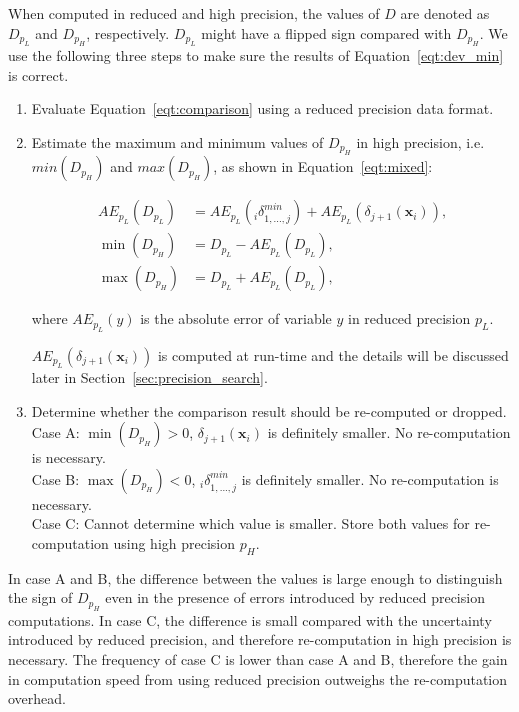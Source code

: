 When computed in reduced and high precision, the values of $D$ are denoted as $D_{p_L}$ and $D_{p_H}$, respectively.
$D_{p_L}$ might have a flipped sign compared with $D_{p_H}$.
We use the following three steps to make sure the results of Equation~\ref{eqt:dev_min} is correct.

\begin{enumerate}
\item Evaluate Equation~\ref{eqt:comparison} using a reduced precision data format. 
\item Estimate the maximum and minimum values of $D_{p_H}$ in high precision, i.e. $min(D_{p_H})$ and $max(D_{p_H})$, as shown in Equation~\ref{eqt:mixed}:

\begin{equation}
\begin{aligned}
AE_{p_L}(D_{p_L}) &= AE_{p_L}({_i\delta}^{min}_{1,...,j}) + AE_{p_L}(\delta_{j+1}(\textbf{x}_i)) \mbox{,} \\
\min{(D_{p_H})} &= D_{p_L} - AE_{p_L}(D_{p_L}) \mbox{,} \\
\max{(D_{p_H})} &= D_{p_L} + AE_{p_L}(D_{p_L}) \mbox{,}
\end{aligned}
\label{eqt:mixed}
\end{equation}

where $AE_{p_L}(y)$ is the absolute error of variable $y$ in reduced precision $p_L$.

$AE_{p_L}(\delta_{j+1}(\textbf{x}_i))$ is computed at run-time and the details will be discussed later in Section~\ref{sec:precision_search}.

\item Determine whether the comparison result should be re-computed or dropped. \\
Case A: $\min{(D_{p_H})}>0$, $\delta_{j+1}(\textbf{x}_i)$ is definitely smaller. No re-computation is necessary. \\
Case B: $\max{(D_{p_H})}<0$, ${_i\delta}^{min}_{1,...,j}$ is definitely smaller. No re-computation is necessary. \\
Case C: Cannot determine which value is smaller. Store both values for re-computation using high precision $p_H$.
\end{enumerate}

In case A and B, the difference between the values is large enough to distinguish the sign of $D_{p_H}$ even in the presence of errors introduced by reduced precision computations.
In case C, the difference is small compared with the uncertainty introduced by reduced precision, and therefore re-computation in high precision is necessary.
The frequency of case C is lower than case A and B, therefore the gain in computation speed from using reduced precision outweighs the re-computation overhead.

